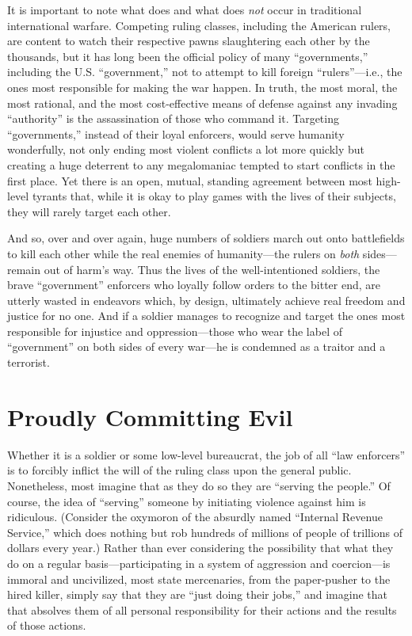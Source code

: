 \documentclass{book}
\begin{document}
It is important to note what does and what does \emph{not} occur in traditional international warfare. Competing ruling classes, including the American rulers, are content to watch their respective pawns slaughtering each other by the thousands, but it has long been the official policy of many \enquote{governments,} including the U.S. \enquote{government,} not to attempt to kill foreign \enquote{rulers}---i.e., the ones most responsible for making the war happen. In truth, the most moral, the most rational, and the most cost-effective means of defense against any invading \enquote{authority} is the assassination of those who command it. Targeting \enquote{governments,} instead of their loyal enforcers, would serve humanity wonderfully, not only ending most violent conflicts a lot more quickly but creating a huge deterrent to any megalomaniac tempted to start conflicts in the first place. Yet there is an open, mutual, standing agreement between most high-level tyrants that, while it is okay to play games with the lives of their subjects, they will rarely target each other.

And so, over and over again, huge numbers of soldiers march out onto battlefields to kill each other while the real enemies of humanity---the rulers on \emph{both} sides---remain out of harm's way. Thus the lives of the well-intentioned soldiers, the brave \enquote{government} enforcers who loyally follow orders to the bitter end, are utterly wasted in endeavors which, by design, ultimately achieve real freedom and justice for no one. And if a soldier manages to recognize and target the ones most responsible for injustice and oppression---those who wear the label of \enquote{government} on both sides of every war---he is condemned as a traitor and a terrorist.

\section{Proudly Committing Evil}

Whether it is a soldier or some low-level bureaucrat, the job of all \enquote{law enforcers} is to forcibly inflict the will of the ruling class upon the general public. Nonetheless, most imagine that as they do so they are \enquote{serving the people.} Of course, the idea of \enquote{serving} someone by initiating violence against him is ridiculous. (Consider the oxymoron of the absurdly named \enquote{Internal Revenue Service,} which does nothing but rob hundreds of millions of people of trillions of dollars every year.) Rather than ever considering the possibility that what they do on a regular basis---participating in a system of aggression and coercion---is immoral and uncivilized, most state mercenaries, from the paper-pusher to the hired killer, simply say that they are \enquote{just doing their jobs,} and imagine that that absolves them of all personal responsibility for their actions and the results of those actions.
\end{document}
